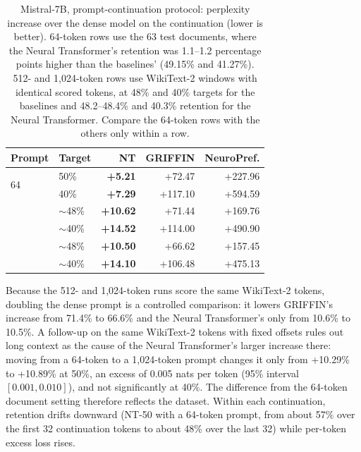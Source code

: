 \documentclass[10pt,twocolumn,letterpaper]{article}
\begin{document}
\begin{table}[t]
\centering
\caption{Mistral-7B, prompt-continuation protocol: perplexity increase over the dense model on the continuation (lower is better). 64-token rows use the 63 test documents, where the Neural Transformer's retention was 1.1--1.2 percentage points higher than the baselines' (49.15\% and 41.27\%). 512- and 1,024-token rows use WikiText-2 windows with identical scored tokens, at 48\% and 40\% targets for the baselines and 48.2--48.4\% and 40.3\% retention for the Neural Transformer. Compare the 64-token rows with the others only within a row.}
\label{tab:ppl}
\small
\setlength{\tabcolsep}{4pt}
\begin{tabular}{@{}llrrr@{}}
\toprule
Prompt & Target & NT & GRIFFIN & NeuroPref. \\
\midrule
\multirow{2}{*}{64}    & 50\%    & \textbf{+5.21} & +72.47  & +227.96 \\
                        & 40\%    & \textbf{+7.29} & +117.10 & +594.59 \\
\addlinespace
\multirow{2}{*}{512}   & $\sim$48\% & \textbf{+10.62} & +71.44  & +169.76 \\
                        & $\sim$40\% & \textbf{+14.52} & +114.00 & +490.90 \\
\addlinespace
\multirow{2}{*}{1,024} & $\sim$48\% & \textbf{+10.50} & +66.62  & +157.45 \\
                        & $\sim$40\% & \textbf{+14.10} & +106.48 & +475.13 \\
\bottomrule
\end{tabular}
\end{table}

Because the 512- and 1,024-token runs score the same WikiText-2 tokens, doubling the dense prompt is a controlled comparison: it lowers GRIFFIN's increase from 71.4\% to 66.6\% and the Neural Transformer's only from 10.6\% to 10.5\%. A follow-up on the same WikiText-2 tokens with fixed offsets rules out long context as the cause of the Neural Transformer's larger increase there: moving from a 64-token to a 1,024-token prompt changes it only from +10.29\% to +10.89\% at 50\%, an excess of 0.005 nats per token (95\% interval $[0.001, 0.010]$), and not significantly at 40\%. The difference from the 64-token document setting therefore reflects the dataset. Within each continuation, retention drifts downward (NT-50 with a 64-token prompt, from about 57\% over the first 32 continuation tokens to about 48\% over the last 32) while per-token excess loss rises.
\end{document}
